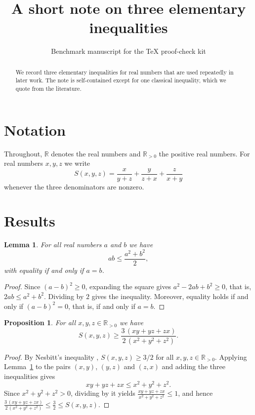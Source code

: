 \documentclass[11pt]{article}
\title{A short note on three elementary inequalities}
\author{Benchmark manuscript for the TeX proof-check kit}
\date{}
\newtheorem{lemma}[theorem]{Lemma}
\newtheorem{proposition}[theorem]{Proposition}
\theoremstyle{remark}
\newcommand{\R}{\mathbb{R}}
\newcommand{\Rpos}{\mathbb{R}_{>0}}
\begin{document}
\maketitle

\begin{abstract}
We record three elementary inequalities for real numbers that are used
repeatedly in later work.  The note is self-contained except for one
classical inequality, which we quote from the literature.
\end{abstract}

\section{Notation}

Throughout, $\R$ denotes the real numbers and $\Rpos$ the positive real
numbers.  For real numbers $x,y,z$ we write
\[
  S(x,y,z) = \frac{x}{y+z} + \frac{y}{z+x} + \frac{z}{x+y}
\]
whenever the three denominators are nonzero.

\section{Results}

\begin{lemma}\label{lem:amgm}
For all real numbers $a$ and $b$ we have
\[
  ab \le \frac{a^2+b^2}{2},
\]
with equality if and only if $a = b$.
\end{lemma}

\begin{proof}
Since $(a-b)^2 \ge 0$, expanding the square gives $a^2 - 2ab + b^2 \ge 0$,
that is, $2ab \le a^2 + b^2$.  Dividing by $2$ gives the inequality.
Moreover, equality holds if and only if $(a-b)^2 = 0$, that is, if and only
if $a = b$.
\end{proof}

\begin{proposition}\label{prop:nesbitt}
For all $x,y,z \in \Rpos$ we have
\[
  S(x,y,z) \ge \frac{3\,(xy+yz+zx)}{2\,(x^2+y^2+z^2)}.
\]
\end{proposition}

\begin{proof}
By Nesbitt's inequality \cite[Theorem~1]{Nesbitt1903}, $S(x,y,z) \ge 3/2$
for all $x,y,z \in \Rpos$.  Applying Lemma~\ref{lem:amgm} to the pairs
$(x,y)$, $(y,z)$ and $(z,x)$ and adding the three inequalities gives
\[
  xy + yz + zx \le x^2 + y^2 + z^2 .
\]
Since $x^2+y^2+z^2 > 0$, dividing by it yields
$\frac{xy+yz+zx}{x^2+y^2+z^2} \le 1$, and hence
$\frac{3\,(xy+yz+zx)}{2\,(x^2+y^2+z^2)} \le \frac{3}{2} \le S(x,y,z)$.
\end{proof}
\end{document}
